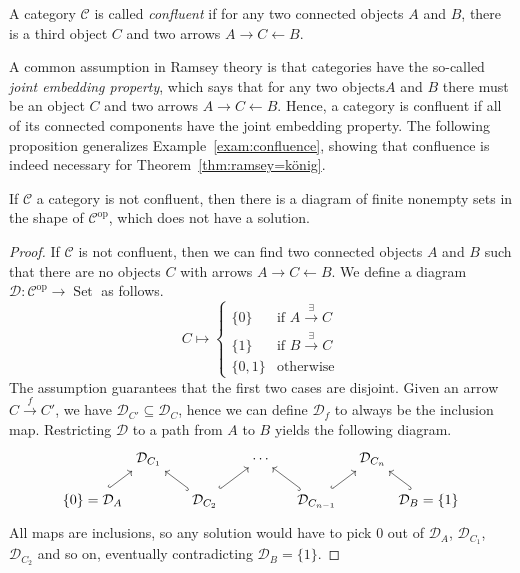 \documentclass[preprint,12pt]{elsarticle}
\newcommand{\cat}[1]{\mathcal{#1}}
\newcommand{\op}{^{\mathop{op}}}
\DeclareMathOperator{\Set}{Set}
\begin{document}
 

\begin{defin}
\label{def:confluent}

A category $\cat C$ is called \emph{confluent} if for any two connected objects $A$ and $B$, there is a third object $ C$ and two arrows $A\to C\leftarrow B$.
\end{defin}

    A common assumption in Ramsey theory is that categories have the so-called \emph{joint embedding property}, which says that for any two objects$A$ and $B$ there must be an object $C$ and two arrows $A\to C\leftarrow B$. Hence, a category is confluent if all of its connected components have the joint embedding property. The following proposition generalizes Example~\ref{exam:confluence}, showing that confluence is indeed necessary for Theorem~\ref{thm:ramsey=könig}.

\begin{prop}
\label{prop:confluence}
    If $\cat C$ a category is not confluent, then there is a diagram of finite nonempty sets in the shape of $\cat C\op$, which does not have a solution.
\end{prop}

\begin{proof}
    If $\cat C$ is not confluent, then we can find two connected objects $A$ and $B$ such that there are no objects $C$ with arrows $A\to C\leftarrow B$. 
    We define a diagram $\cat D:\cat C\op\to\Set$ as follows.
    $$
    C\mapsto 
    \begin{cases}
    \{0\} & \text{if } A\xrightarrow{\exists} C \\
    \{1\} & \text{if } B\xrightarrow{\exists} C \\
    \{0,1\} & \text{otherwise}
    \end{cases}
    $$
    The assumption guarantees that the first two cases are disjoint.
    Given an arrow $C\xrightarrow{f}C'$, we have $\cat D_{C'}\subseteq\cat D_C$, hence we can define $\cat D_f$ to always be the inclusion map. Restricting $\cat D$ to a path from $A$ to $B$ yields the following diagram.
$$
    \begin{tikzcd}[column sep={4em,between origins},row sep={3em,between origins}]
  & \cat D_{C_1} &         & \cdots  &         & \cat D_{C_n}&   \\
 \{0\} =\cat D_A\arrow[ru, hook] &   & \cat D_{C_2} \arrow[lu, hook]\arrow[ru, hook]&    & \cat D_{C_{n-1}} \arrow[lu, hook]\arrow[ru, hook]&                               & \cat D_B = \{1\}\arrow[lu, hook]
\end{tikzcd}
$$
All maps are inclusions, so any solution would have to pick $0$ out of $\cat D_A$, $\cat D_{C_1}$, $\cat D_{C_2}$ and so on, eventually contradicting $\cat D_B =\{1\}$.
\end{proof}
\end{document}
